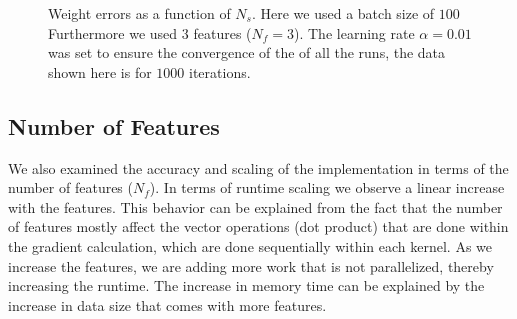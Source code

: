 \documentclass[11pt,a4paper]{article}
\begin{document}
\begin{figure}[H]
  \caption{Weight errors as a function of $N_s$. Here we used a batch size of $100$ Furthermore we used $3$ features ($N_f=3$). The learning rate $\alpha=0.01$ was set to ensure the convergence of the of all the runs, the data shown here is for $1000$ iterations.}
  \label{fig:n_samples_weights_error}
\endminipage
\end{figure}

\subsection{Number of Features}

We also examined the accuracy and scaling of the implementation in terms of the number
of features ($N_f$). In terms of runtime scaling we observe a linear increase with
the features. This behavior can be explained from the fact that the number of
features mostly affect the vector operations (dot product)
that are done within the gradient calculation, which are done sequentially within each kernel.
As we increase the features, we are adding more work that is not parallelized, thereby
increasing the runtime. The increase in memory time can be explained by the increase in data
size that comes with more features.
\end{document}
